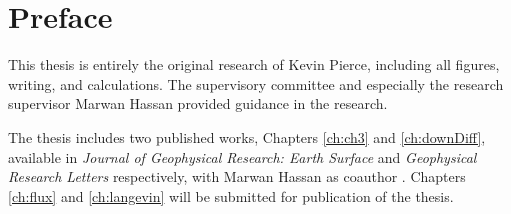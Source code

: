 
\chapter{Preface}

This thesis is entirely the original research of Kevin Pierce, including all figures, writing, and calculations.
The supervisory committee and especially the research supervisor Marwan Hassan provided guidance in the research.
\DIFaddbegin {}

\DIFaddend The thesis includes two published works, Chapters \ref{ch:ch3} and \ref{ch:downDiff}, available in \textit{Journal of Geophysical Research: Earth Surface} and \textit{Geophysical Research Letters} respectively, with Marwan Hassan as coauthor \citep{Pierce2020a,Pierce2020b}. Chapters \ref{ch:flux} and \ref{ch:langevin} will be submitted for publication \DIFdelbegin {}\DIFdelend \DIFaddbegin {}\DIFaddend of the thesis.
